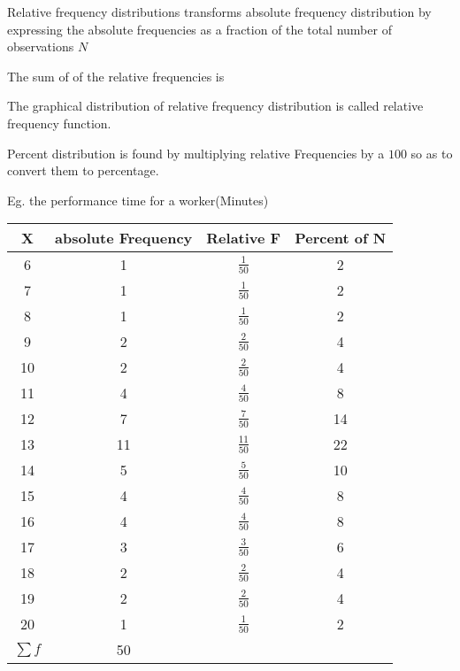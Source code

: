Relative frequency distributions transforms absolute frequency distribution by expressing the absolute frequencies as a fraction of the total number of observations $N$

The sum of of the relative frequencies is

The graphical distribution of relative frequency distribution is called relative frequency function.

Percent distribution is found by multiplying relative Frequencies by a $100$ so as to convert them to percentage.

Eg. the performance time for a worker(Minutes)


\begin{table}[H]
    \centering
    \begin{tabular}{|c|c|c|c|}
        \hline X        & absolute Frequency & Relative F      & Percent of N \\
        \hline 6        & 1                  & $\frac{1}{50}$  & 2            \\
        \hline 7        & 1                  & $\frac{1}{50}$  & 2            \\
        \hline 8        & 1                  & $\frac{1}{50}$  & 2            \\
        \hline 9        & 2                  & $\frac{2}{50}$  & 4            \\
        \hline 10       & 2                  & $\frac{2}{50}$  & 4            \\
        \hline 11       & 4                  & $\frac{4}{50}$  & 8            \\
        \hline 12       & 7                  & $\frac{7}{50}$  & 14           \\
        \hline 13       & 11                 & $\frac{11}{50}$ & 22           \\
        \hline 14       & 5                  & $\frac{5}{50}$  & 10           \\
        \hline 15       & 4                  & $\frac{4}{50}$  & 8            \\
        \hline 16       & 4                  & $\frac{4}{50}$  & 8            \\
        \hline 17       & 3                  & $\frac{3}{50}$  & 6            \\
        \hline 18       & 2                  & $\frac{2}{50}$  & 4            \\
        \hline 19       & 2                  & $\frac{2}{50}$  & 4            \\
        \hline 20       & 1                  & $\frac{1}{50}$  & 2            \\
        \hline $\sum f$ & 50                 &                 &              \\

        \hline
    \end{tabular}
\end{table}



